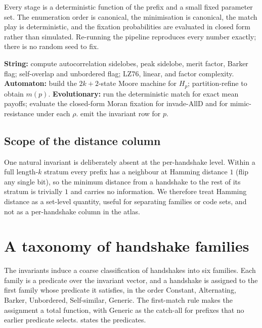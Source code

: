 Every stage is a deterministic function of the prefix and a small fixed parameter set.
The enumeration order is canonical, the minimisation is canonical, the match play is
deterministic, and the fixation probabilities are evaluated in closed form rather than
simulated. Re-running the pipeline reproduces every number exactly; there is no random
seed to fix.

\begin{algorithm}[t]
\caption{The atlas pipeline for length bound $K$}
\label{alg:pipeline}
\begin{algorithmic}[1]
    \State \textbf{String:} compute autocorrelation sidelobes, peak sidelobe, merit
      factor, Barker flag; self-overlap and unbordered flag; LZ76, linear, and factor
      complexity.
    \State \textbf{Automaton:} build the $2k+2$-state Moore machine for $H_p$;
      partition-refine to obtain $m(p)$.
      \State \textbf{Evolutionary:} run the deterministic match for exact mean payoffs;
        evaluate the closed-form Moran fixation for invade-AllD and for
        mimic-resistance under each $\rho$.
    \EndIf
    \State emit the invariant row for $p$.
  \EndFor
\EndFor
\end{algorithmic}
\end{algorithm}

\subsection{Scope of the distance column}

One natural invariant is deliberately absent at the per-handshake level. Within a full
length-$k$ stratum every prefix has a neighbour at Hamming distance $1$ (flip any single
bit), so the minimum distance from a handshake to the rest of its stratum is trivially
$1$ and carries no information. We therefore treat Hamming distance as a set-level
quantity, useful for separating families or code sets, and not as a per-handshake
column in the atlas.

\section{A taxonomy of handshake families}\label{sec:families}

The invariants induce a coarse classification of handshakes into six families. Each
family is a predicate over the invariant vector, and a handshake is assigned to the
first family whose predicate it satisfies, in the order Constant, Alternating, Barker,
Unbordered, Self-similar, Generic. The first-match rule makes the assignment a total
function, with Generic as the catch-all for prefixes that no earlier predicate selects.
 states the predicates.

